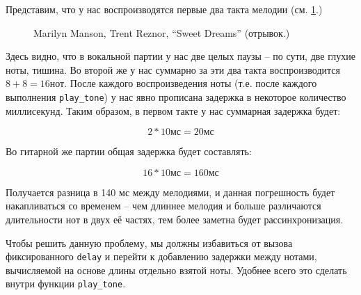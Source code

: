 \documentclass[../sparc.tex]{subfiles}
\begin{document}
Представим, что у нас воспроизводятся первые два такта мелодии
(см. \ref{fig:lilypond-melody-sweet-dreams-part}.)

\begin{figure}[!h]
  \caption{Marilyn Manson, Trent Reznor, ``Sweet Dreams'' (отрывок.)}
  \label{fig:lilypond-melody-sweet-dreams-part}
\end{figure}

Здесь видно, что в вокальной партии у нас две целых паузы -- по сути, две глухие
ноты, тишина.  Во второй же у нас суммарно за эти два такта воспроизводится $8 +
8 = 16 \mbox{нот}$.  После каждого воспроизведения ноты (т.е. после каждого
выполнения \texttt{play\_tone}) у нас явно прописана задержка в некоторое
количество миллисекунд.  Таким образом, в первом такте у нас суммарная задержка
будет:

\begin{equation}
  2 * 10 \mbox{мс} = 20 \mbox{мс}
\end{equation}

Во гитарной же партии общая задержка будет составлять:

\begin{equation}
  16 * 10 \mbox{мс} = 160 \mbox{мс}
\end{equation}

Получается разница в 140 мс между мелодиями, и данная погрешность будет
накапливаться со временем -- чем длиннее мелодия и больше различаются
длительности нот в двух её частях, тем более заметна будет рассинхронизация.

Чтобы решить данную проблему, мы должны избавиться от вызова фиксированного
\texttt{delay} и перейти к добавлению задержки между нотами, вычисляемой на
основе длины отдельно взятой ноты.  Удобнее всего это сделать внутри функции
\texttt{play\_tone}.
\end{document}

